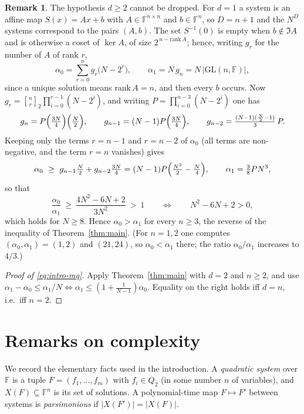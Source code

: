 \documentclass[11pt,a4paper]{article}
\theoremstyle{definition}
\newtheorem{remark}[theorem]{Remark}
\newcommand{\FF}{\mathbb{F}}
\begin{document}
\begin{remark}\label{rem:final}
The hypothesis $d\ge2$ cannot be dropped. For $d=1$ a system is an affine map
$S(x)=Ax+b$ with $A\in\FF^{n\times n}$ and $b\in\FF^n$, so $D=n+1$ and the $N^{D}$
systems correspond to the pairs $(A,b)$. The set $S^{-1}(0)$ is empty when
$b\notin\Im A$ and is otherwise a coset of $\ker A$, of size $2^{\,n-\mathrm{rank}\,A}$; hence,
writing $g_r$ for the number of $A$ of rank $r$,
\[
\alpha_0=\sum_{r=0}^{n}g_r\bigl(N-2^{r}\bigr),
\qquad
\alpha_1=N\,g_n=N\,|\mathrm{GL}(n,\FF)| ,
\]
since a unique solution means $\mathrm{rank}\,A=n$, and then every $b$ occurs. Now
$g_r=\genfrac{[}{]}{0pt}{}{n}{r}_2\prod_{i=0}^{r-1}(N-2^{i})$, and writing
$P=\prod_{i=0}^{n-3}(N-2^{i})$ one has
\[
g_n=P\Bigl(\tfrac{3N}4\Bigr)\Bigl(\tfrac N2\Bigr),\qquad
g_{n-1}=(N-1)P\Bigl(\tfrac{3N}4\Bigr),\qquad
g_{n-2}=\tfrac{(N-1)(\frac N2-1)}3\,P .
\]
Keeping only the terms $r=n-1$ and $r=n-2$ of $\alpha_0$ (all terms are
non-negative, and the term $r=n$ vanishes) gives
\[
\alpha_0\ \ge\ g_{n-1}\tfrac N2+g_{n-2}\tfrac{3N}4
=(N-1)P\Bigl(\tfrac{N^{2}}2-\tfrac N4\Bigr),
\qquad
\alpha_1=\tfrac38PN^{3},
\]
so that
\[
\frac{\alpha_0}{\alpha_1}\ \ge\ \frac{4N^{2}-6N+2}{3N^{2}}\ >\ 1
\qquad\Longleftrightarrow\qquad N^{2}-6N+2>0 ,
\]
which holds for $N\ge8$. Hence $\alpha_0>\alpha_1$ for every $n\ge3$, the reverse
of the inequality of Theorem~\ref{thm:main}. \textup{(}For $n=1,2$ one computes
$(\alpha_0,\alpha_1)=(1,2)$ and $(21,24)$, so $\alpha_0<\alpha_1$ there; the ratio
$\alpha_0/\alpha_1$ increases to $4/3$.\textup{)}
\end{remark}

\begin{proof}[Proof of \eqref{eq:intro-mq}]
Apply Theorem~\ref{thm:main} with $d=2$ and $n\ge2$, and use $\alpha_1-\alpha_0\le\alpha_1/N\iff\alpha_1\le(1+\frac1{N-1})\alpha_0$. Equality on the right holds iff $d=n$, i.e.\ iff $n=2$.
\end{proof}


\section{Remarks on complexity}\label{sec:complexity}

We record the elementary facts used in the introduction. A \emph{quadratic system} over $\FF$ is a tuple $F=(f_1,\dots,f_m)$ with $f_i\in Q_2$ (in some number $n$ of variables), and $X(F)\subseteq\FF^n$ is its set of solutions. A polynomial-time map $F\mapsto F'$ between systems is \emph{parsimonious} if $|X(F')|=|X(F)|$.
\end{document}
